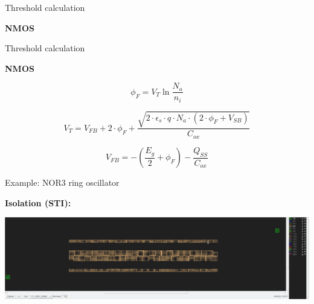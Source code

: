 \documentclass[aspectratio=169]{beamer}
\begin{document}
\begin{frame}{Threshold calculation}
	\begin{center}
		\textbf{NMOS}

		\begin{tikzpicture}[node distance = 3cm, auto, thick, scale=0.75, every node/.style={transform shape}]
			
		\end{tikzpicture}
	\end{center}
\end{frame}

\begin{frame}{Threshold calculation}
	\begin{center}
		\textbf{NMOS}

		\begin{equation}
			\phi_F = V_T \ln\frac{N_a}{n_i}
		\end{equation}

		\begin{equation}
			V_T
			=
			V_{FB}
			+
			2 \cdot \phi_F
			+
			\frac{\sqrt{2 \cdot \epsilon_s  \cdot q \cdot N_a \cdot \left( 2 \cdot \phi_F + V_{SB} \right) }}{C_{ox}}
		\end{equation}

		\begin{equation}
			V_{FB} = -\left( \frac{E_g}{2} + \phi_F \right) - \frac{Q_{SS}}{C_{ox}}
		\end{equation}

	\end{center}
\end{frame}

\begin{frame}{Example: NOR3 ring oscillator}
	\begin{center}
		\textbf{Isolation (STI):}

		\includegraphics[width=\textwidth]{images/Screenshot_20181220_164222.png}
	\end{center}
\end{frame}
\end{document}
